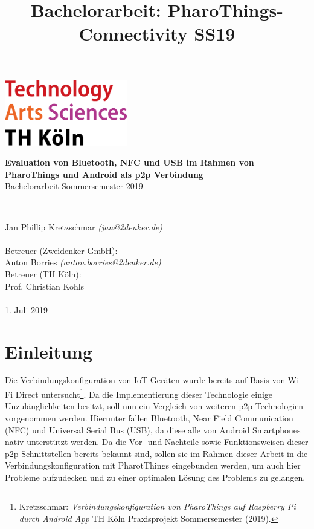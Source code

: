 \documentclass[12pt,a4paper]{article}
\title{Bachelorarbeit: PharoThings-Connectivity SS19}
\begin{document}
	\begin{titlepage}
    \includegraphics[width=0.4\textwidth]{../latex-ai-project/th_logo.png}
    ~\\[2.5cm]
    \begin{center}
    \textbf{\huge Evaluation von Bluetooth, NFC und USB im Rahmen von PharoThings und Android als p2p Verbindung}\\[0.5cm]
    {\Large Bachelorarbeit Sommersemester 2019}
    \vfill
    \end{center}
    ~\\[2.0cm]
    \begin{flushright}
    {\large Jan Phillip Kretzschmar \it{(jan@2denker.de)}}\\[0.1cm]
    ~\\[1.0cm]
    {\large Betreuer (Zweidenker GmbH):}\\[0.1cm]
    {\large Anton Borries \it{(anton.borries@2denker.de)}}
    ~\\[0.5cm]
    {\large Betreuer (TH Köln):}\\[0.1cm]
    {\large Prof. Christian Kohls}\\[0.1cm]

	~\\[1.0cm]
    {\large 1. Juli 2019}
	\end{flushright}
    \end{titlepage}
    \pagebreak
	\tableofcontents
	\pagebreak
	
    \section{Einleitung}
        Die Verbindungskonfiguration von IoT Geräten wurde bereits auf Basis von Wi-Fi Direct untersucht\footnote{Kretzschmar: {\it Verbindungskonfiguration von PharoThings auf Raspberry Pi durch Android App} TH Köln Praxisprojekt Sommersemester (2019).}. Da die Implementierung dieser Technologie einige Unzulänglichkeiten besitzt, soll nun ein Vergleich von weiteren p2p Technologien vorgenommen werden. Hierunter fallen Bluetooth, Near Field Communication (NFC) und Universal Serial Bus (USB), da diese alle von Android Smartphones nativ unterstützt werden. Da die Vor- und Nachteile sowie Funktionsweisen dieser p2p Schnittstellen bereits bekannt sind, sollen sie im Rahmen dieser Arbeit in die Verbindungskonfiguration mit PharotThings eingebunden werden, um auch hier Probleme aufzudecken und zu einer optimalen Lösung des Problems zu gelangen.
        
\end{document}
